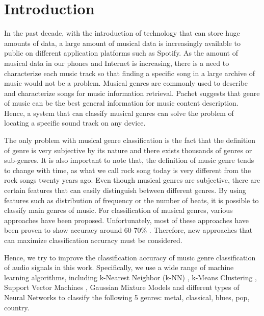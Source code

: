 \section{Introduction}
In the past decade, with the introduction of technology that can store huge amounts of data, a large amount of musical data is increasingly available to public on different application platforms such as Spotify. As the amount of musical data in our phones and Internet is increasing, there is a need to characterize each music track so that finding a specific song in a large archive of music would not be a problem. Musical genres are commonly used to describe and characterize songs for music information retrieval. Pachet \cite{Pachet:2003} suggests that genre of music can be the best general information for music content description. Hence, a system that can classify musical genres can solve the problem of locating a specific sound track on any device. 

The only problem with musical genre classification is the fact that the definition of genre is very subjective by its nature and there exists thousands of genres or sub-genres. It is also important to note that, the definition of music genre tends to change with time, as what we call rock song today is very different from the rock songs twenty years ago. Even though musical genres are subjective, there are certain features that can easily distinguish between different genres. By using features such as distribution of frequency or the number of beats, it is possible to classify main genres of music. For classification of musical genres, various approaches have been proposed. Unfortunately, most of these approaches have been proven to show accuracy around 60-70\% \cite{GTZAN:2002}. Therefore, new approaches that can maximize classification accuracy must be considered.  

Hence, we try to improve the classification accuracy of music genre classification of audio signals in this work. Specifically, we use a wide range of machine learning algorithms, including k-Nearest Neighbor (k-NN) \cite{KNN:2009}, k-Means Clustering \cite{Clustering:2001}, Support Vector Machines \cite{SVM:2006}, Gaussian Mixture Models \cite{Pachet:2003} and different types of Neural Networks to classify the following 5 genres: metal, classical, blues, pop, country. 

